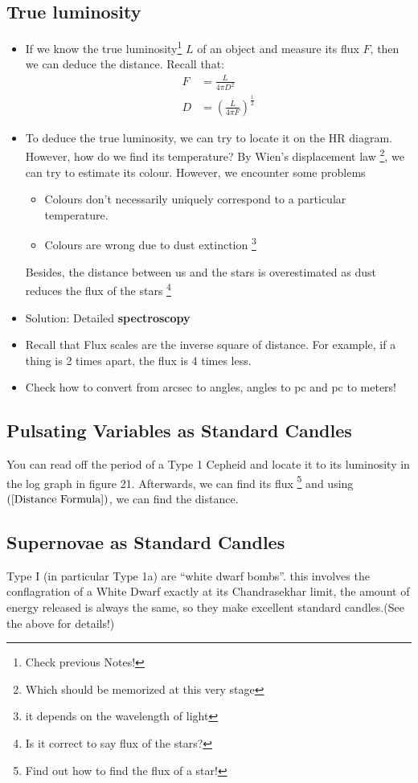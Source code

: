 \documentclass{article}
\begin{document}
\subsection{True luminosity}
 \begin{itemize}
 \item If we know the true luminosity\footnote{Check previous Notes!} $L$ of an object and measure its flux $F$, then we can deduce the distance. Recall that:
 \begin{align}
 F&=\frac{L}{4 \pi D^2} \\
 D&=\left(\frac{L}{4 \pi F} \right) ^{\frac{1}{2}}
 \label{Distance Formula}
 \end{align}
\item To deduce the true luminosity, we can try to locate it on the HR diagram. However, how do we find its temperature? By Wien's displacement law \footnote{ Which should be memorized at this very stage}, we can try to estimate its colour.
However, we encounter some problems
\begin{itemize}
\item Colours don't necessarily uniquely correspond to a particular temperature.
\item Colours are wrong due to dust extinction \footnote{it depends on the wavelength of light}
\end{itemize}
Besides, the distance between us and the stars is overestimated as dust reduces the flux of the stars \footnote{Is it correct to say flux of the stars?}
\item Solution: Detailed \textbf{spectroscopy}
\item Recall that Flux scales are the inverse square of distance. For example, if a thing is 2 times apart, the flux is 4 times less.
\item Check how to convert from arcsec to angles, angles to pc and pc to meters!
\end{itemize}
\subsection{Pulsating Variables as Standard Candles}
You can read off the period of a Type 1 Cepheid and locate it to its luminosity in the log graph in figure 21. Afterwards, we can find its flux \footnote{Find out how to find the flux of a star!} and using $(\ref{Distance Formula})$, we can find the distance.
\subsection{Supernovae as Standard Candles}
Type I (in particular Type 1a) are “white dwarf bombs”.
this involves the conflagration of a White Dwarf exactly at its Chandrasekhar limit, the amount
of energy released is always the same, so they make excellent standard candles.(See the above for details!)
\end{document}
